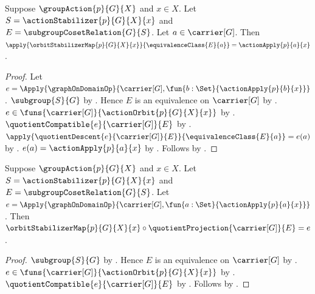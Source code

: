 \begin{proposition}\label{orbit_stabilizer_map_apply}
    Suppose $\groupAction{p}{G}{X}$ and $x\in X$.
    Let $S=\actionStabilizer{p}{G}{X}{x}$ and
        $E=\subgroupCosetRelation{G}{S}$.
    Let $a\in\carrier[G]$.
    Then
        $\apply{\orbitStabilizerMap{p}{G}{X}{x}}
            {\equivalenceClass{E}{a}}
        =\actionApply{p}{a}{x}$.
\end{proposition}
\begin{proof}
    Let
        $e=\Apply{\graphOnDomainOp}{
            \carrier[G],\fun{b:\Set}{\actionApply{p}{b}{x}}}$.
    $\subgroup{S}{G}$ by .
    Hence $E$ is an equivalence on $\carrier[G]$ by
        .
    $e\in\funs{\carrier[G]}{\actionOrbit{p}{G}{X}{x}}$ by
        .
    $\quotientCompatible{e}{\carrier[G]}{E}$ by
        .
    $\apply{\quotientDescent{e}{\carrier[G]}{E}}
        {\equivalenceClass{E}{a}}=e(a)$ by
        .
    $e(a)=\actionApply{p}{a}{x}$ by
        .
    Follows by .
\end{proof}

\begin{theorem}\label{orbit_stabilizer_map_factorization}
    Suppose $\groupAction{p}{G}{X}$ and $x\in X$.
    Let $S=\actionStabilizer{p}{G}{X}{x}$ and
        $E=\subgroupCosetRelation{G}{S}$.
    Let
        $e=\Apply{\graphOnDomainOp}{
            \carrier[G],\fun{a:\Set}{\actionApply{p}{a}{x}}}$.
    Then
        $\orbitStabilizerMap{p}{G}{X}{x}
            \circ\quotientProjection{\carrier[G]}{E}=e$.
\end{theorem}
\begin{proof}
    $\subgroup{S}{G}$ by .
    Hence $E$ is an equivalence on $\carrier[G]$ by
        .
    $e\in\funs{\carrier[G]}{\actionOrbit{p}{G}{X}{x}}$ by
        .
    $\quotientCompatible{e}{\carrier[G]}{E}$ by
        .
    Follows by
        .
\end{proof}

